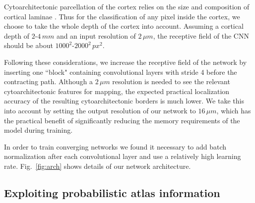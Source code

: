 \documentclass{article}
\begin{document}
Cytoarchitectonic parcellation of the cortex relies on the size and composition of cortical laminae \cite{schleicher1999}.
Thus for the classification of any pixel inside the cortex, we choose to take the whole depth of the cortex into account.
Assuming a cortical depth of $2$-$4\,mm$ and an input resolution of $2\,\mu m$, the receptive field of the CNN should be about $1000^2$-$2000^2\,px^2$. %

Following these considerations, we increase the receptive field of the network by inserting one ``block" containing convolutional layers with stride 4 before the contracting path.
Although a $2\,\mu m$ resolution is needed to see the relevant cytoarchitectonic features for mapping, the expected practical localization accuracy of the resulting cytoarchitectonic borders is much lower.
We take this into account by setting the output resolution of our network to $16\,\mu m$, which has the practical benefit of significantly reducing the memory requirements of the model during training.

In order to train converging networks we found it necessary to add batch normalization after each convolutional layer and use a relatively high learning rate.
Fig.~\ref{fig:arch} shows details of our network architecture.

\vspace*{-.5\baselineskip}
\subsection{Exploiting probabilistic atlas information}
\label{sec:arch:prior}
\vspace*{-.5\baselineskip}
\end{document}
